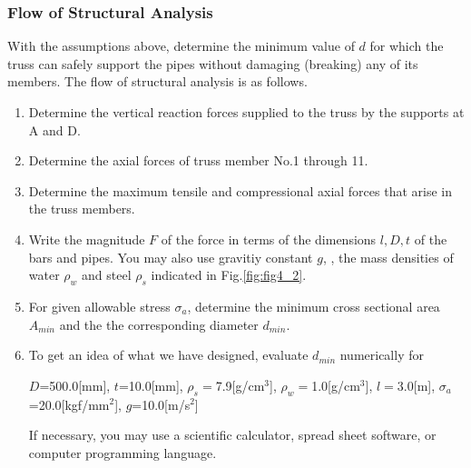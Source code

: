 \documentclass[10pt,a4j]{article}
\begin{document}
\subsubsection{Flow of Structural Analysis}
With the assumptions above, determine the minimum value of $d$ for which the 
truss can safely support the pipes without damaging (breaking) any of its members. 
The flow of structural analysis is as follows.
\begin{enumerate}
\item
	Determine the vertical reaction forces supplied to the truss by the supports at A and D. 
\item
	Determine the axial forces of truss member No.1 through 11. 
\item
	Determine the maximum tensile and compressional axial forces that arise in the truss members. 
\item
	Write the magnitude $F$ of the force in terms of the dimensions 
	$l,D,t$ of the bars and pipes. You may also use gravitiy constant $g$, 
	, the mass densities of water $\rho_w$ and steel $\rho_s$ 
	indicated in Fig.\ref{fig:fig4_2}. 
\item
	For given allowable stress $\sigma_a$, determine the minimum cross sectional 
	area $A_{min}$ and the the corresponding diameter $d_{min}$. 
\item
	To get an idea of what we have designed, evaluate $d_{min}$ numerically for\\
		\begin{center}
			$D$=500.0[mm], $t$=10.0[mm], 
			$\rho_s=$7.9[g/cm$^3$],
			$\rho_w=$1.0[g/cm$^3$],
			$l=3.0$[m],
			$\sigma_a$=20.0[kgf/mm$^2$], $g$=10.0[m/s$^2$]
		\end{center}
	If necessary, you may use a scientific calculator, spread sheet software, or computer programming language. 
\end{enumerate}
\end{document}
